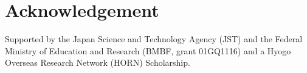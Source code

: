 \documentclass{frontiersSCNS} %
\begin{document}

\section*{Acknowledgement}
Supported by the Japan Science and Technology Agency (JST) and the Federal
Ministry of Education and Research (BMBF, grant 01GQ1116) and a Hyogo Overseas
Research Network (HORN) Scholarship.









\end{document}
